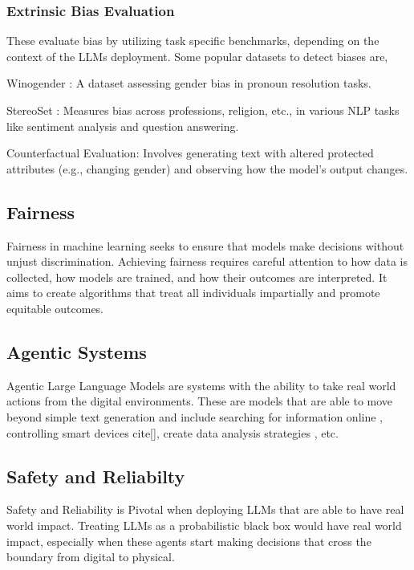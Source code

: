 \documentclass[11pt]{article}
\begin{document}
\subsubsection{Extrinsic Bias Evaluation}

These evaluate bias by utilizing task specific benchmarks, depending on the context of the LLMs deployment.
Some popular datasets to detect biases are,

Winogender \cite{rudinger-EtAl:2018:N18}: A dataset assessing gender bias in pronoun resolution tasks.

StereoSet \cite{nadeem2020stereoset}: Measures bias across professions, religion, etc., in various NLP tasks like sentiment analysis and question answering.

Counterfactual Evaluation: Involves generating text with altered protected attributes (e.g., changing gender) and observing how the model's output changes.

\subsection{Fairness}

Fairness in machine learning \cite{pessach2022review} seeks to ensure that models make decisions without unjust discrimination. Achieving fairness requires careful attention to how data is collected, how models are trained, and how their outcomes are interpreted. It aims to create algorithms that treat all individuals impartially and promote equitable outcomes.


\subsection{Agentic Systems}

Agentic Large Language Models are systems with the ability to take real world actions from the digital environments. These are models that are able to move beyond simple text generation and include searching for information online , controlling smart devices cite[], create data analysis strategies \cite{yang2024matplotagent}, etc.

\subsection{Safety and Reliabilty}

Safety and Reliability is Pivotal when deploying LLMs that are able to have real world impact. Treating LLMs as a probabilistic black box would have real world impact, especially when these agents start making decisions that cross the boundary from digital to physical. \cite{chan2023harms}
\end{document}
